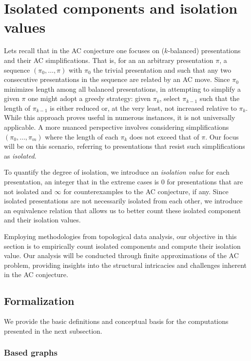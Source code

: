 
\section{Isolated components and isolation values}\label{s:isolation}

Lets recall that in the AC conjecture one focuses on ($k$-balanced) presentations and their AC simplifications.
That is, for an an arbitrary presentation $\pi$, a sequence $(\pi_0,\dots,\pi)$ with $\pi_0$ the trivial presentation and such that any two consecutive presentations in the sequence are related by an AC move.
Since $\pi_0$ minimizes length among all balanced presentations, in attempting to simplify a given $\pi$ one might adopt a greedy strategy: given $\pi_k$, select $\pi_{k-1}$ such that the length of $\pi_{k-1}$ is either reduced or, at the very least, not increased relative to $\pi_k$.
While this approach proves useful in numerous instances, it is not universally applicable.
A more nuanced perspective involves considering simplifications $(\pi_0,\dots,\pi_m)$ where the length of each $\pi_k$ does not exceed that of $\pi$.
Our focus will be on this scenario, referring to presentations that resist such simplifications as \textit{isolated}.

To quantify the degree of isolation, we introduce an \textit{isolation value} for each presentation,
an integer that in the extreme cases is $0$ for presentations that are not isolated and $\infty$ for counterexamples to the AC conjecture, if any.
Since isolated presentations are not necessarily isolated from each other, we introduce an equivalence relation that allows us to better count these isolated component and their isolation values.

Employing methodologies from topological data analysis, our objective in this section is to empirically count isolated components and compute their isolation value.
Our analysis will be conducted through finite approximations of the AC problem, providing insights into the structural intricacies and challenges inherent in the AC conjecture.

\subsection{Formalization}

We provide the basic definitions and conceptual basis for the computations presented in the next subsection.

\subsubsection{Based graphs}

